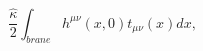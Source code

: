 \begin{equation}\label{interaction}
 \frac{\hat \kappa}{2} \int_{brane} h^{\mu\nu}(x,0) t_{\mu\nu}(x) dx,
\end{equation}

